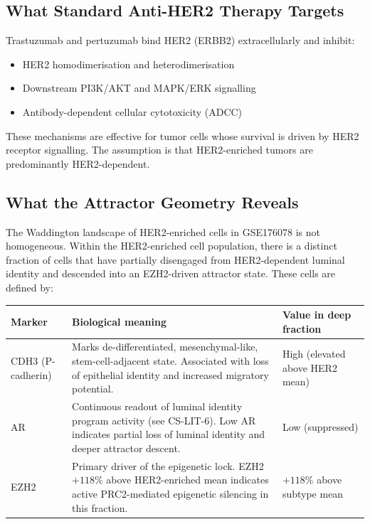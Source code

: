 \documentclass[12pt, a4paper]{article}
\begin{document}
\subsection{What Standard Anti-HER2 Therapy
Targets}

Trastuzumab and pertuzumab bind HER2
(ERBB2) extracellularly and inhibit:
\begin{itemize}
    \item HER2 homodimerisation and
    heterodimerisation
    \item Downstream PI3K/AKT and MAPK/ERK
    signalling
    \item Antibody-dependent cellular
    cytotoxicity (ADCC)
\end{itemize}

These mechanisms are effective for tumor
cells whose survival is driven by
HER2 receptor signalling. The assumption
is that HER2-enriched tumors are
predominantly HER2-dependent.

\subsection{What the Attractor Geometry
Reveals}

The Waddington landscape of HER2-enriched
cells in GSE176078 is not homogeneous.
Within the HER2-enriched cell population,
there is a distinct fraction of cells that
have partially disengaged from
HER2-dependent luminal identity and
descended into an EZH2-driven attractor
state. These cells are defined by:

\begin{center}
\begin{tabular}{p{3.5cm}p{5.5cm}p{3.5cm}}
\toprule
\textbf{Marker} &
\textbf{Biological meaning} &
\textbf{Value in deep fraction} \\
\midrule
CDH3 (P-cadherin) &
Marks de-differentiated, mesenchymal-like,
stem-cell-adjacent state. Associated with
loss of epithelial identity and increased
migratory potential. &
High (elevated above HER2 mean) \\[0.5em]
AR &
Continuous readout of luminal identity
program activity (see CS-LIT-6). Low AR
indicates partial loss of luminal identity
and deeper attractor descent. &
Low (suppressed) \\[0.5em]
EZH2 &
Primary driver of the epigenetic lock.
EZH2 $+118\%$ above HER2-enriched mean
indicates active PRC2-mediated epigenetic
silencing in this fraction. &
$+118\%$ above subtype mean \\
\bottomrule
\end{tabular}
\end{center}
\end{document}
